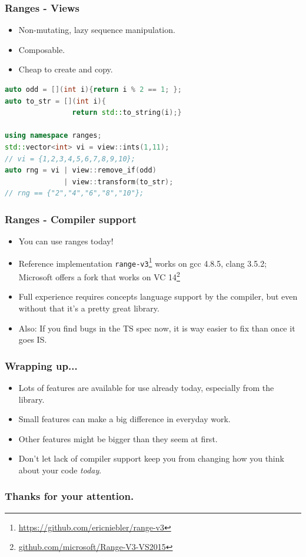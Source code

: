 \documentclass{beamer}
\begin{document}
\begin{frame}[fragile]
\begin{lstlisting}[language=C++,basicstyle=\ttfamily,keywordstyle=\color{blue},showstringspaces=false]
\end{lstlisting}
\end{frame}

\begin{frame}[fragile]
    \frametitle{Ranges - Views}
    \begin{itemize}
        \item Non-mutating, lazy sequence manipulation.
        \item Composable.
        \item Cheap to create and copy.
    \end{itemize}
    \begin{lstlisting}[language=C++,basicstyle=\ttfamily,keywordstyle=\color{blue},showstringspaces=false]
auto odd = [](int i){return i % 2 == 1; };
auto to_str = [](int i){
                return std::to_string(i);}

using namespace ranges;
std::vector<int> vi = view::ints(1,11);
// vi = {1,2,3,4,5,6,7,8,9,10};
auto rng = vi | view::remove_if(odd)
              | view::transform(to_str);
// rng == {"2","4","6","8","10"};
    \end{lstlisting}
\end{frame}

\begin{frame}
    \frametitle{Ranges - Compiler support}
    \begin{itemize}
        \item You can use ranges today!
        \item Reference implementation \texttt{range-v3}\footnote{\url{https://github.com/ericniebler/range-v3}} works on gcc 4.8.5, clang 3.5.2; Microsoft offers a fork that works on VC 14\footnote{\url{github.com/microsoft/Range-V3-VS2015}}
        \item Full experience requires concepts language support by the compiler, but even without that it's a pretty great library.
        \item Also: If you find bugs in the TS spec now, it is way easier to fix than once it goes IS.
    \end{itemize}
\end{frame}


\begin{frame}
    \frametitle{Wrapping up...}
    \begin{itemize}
        \item Lots of features are available for use already today, especially from the library.
        \item Small features can make a big difference in everyday work.
        \item Other features might be bigger than they seem at first.
        \item Don't let lack of compiler support keep you from changing how you think about your code \emph{today}.
    \end{itemize}
\end{frame}

\fi

\begin{frame}
  \frametitle{Thanks for your attention.}
\end{frame}
\end{document}

